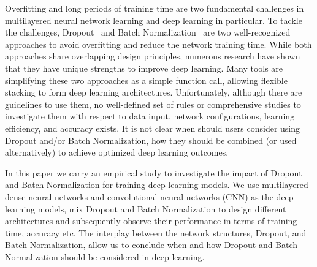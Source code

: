 \documentclass[../Dropout-vs-batch-normalization.tex]{subfiles}
\begin{document}
Overfitting and long periods of training time are two fundamental challenges in multilayered neural network learning and deep learning in particular. To tackle the challenges, Dropout~\cite{Srivastava2014} and Batch Normalization~\cite{Ioffe2015} are two well-recognized approaches to avoid overfitting and reduce the network training time. While both approaches share overlapping design principles, numerous research have shown that they have unique strengths to improve deep learning. Many tools are simplifying these two approaches as a simple function call, allowing flexible stacking to form deep learning architectures. Unfortunately, although there are guidelines to use them, no well-defined set of rules or comprehensive studies to investigate them with respect to data input, network configurations, learning efficiency, and accuracy exists. It is not clear when should users consider using Dropout and/or Batch Normalization, how they should be combined (or used alternatively) to achieve optimized deep learning outcomes.

In this paper we carry an empirical study to investigate the impact of Dropout and Batch Normalization for training deep learning models. We use multilayered dense neural networks and convolutional neural networks (CNN) as the deep learning models, mix Dropout and Batch Normalization to design different architectures and subsequently observe their performance in terms of training time, accuracy etc. The interplay between the network structures, Dropout, and Batch Normalization, allow us to conclude when and how Dropout and Batch Normalization should be considered in deep learning. 


\end{document}

